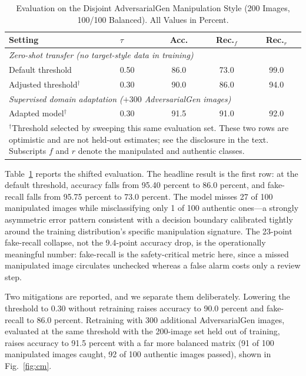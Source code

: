 \documentclass[conference,a4paper]{IEEEtran}
\begin{document}
\begin{table}[t]
\caption{Evaluation on the Disjoint AdversarialGen Manipulation Style
(200 Images, 100/100 Balanced). All Values in Percent.}
\label{tab:shift}
\centering
\setlength{\tabcolsep}{3pt}
\begin{tabular}{llccc}
\toprule
\textbf{Setting} & \textbf{$\tau$} & \textbf{Acc.} &
\textbf{Rec.$_{f}$} & \textbf{Rec.$_{r}$} \\
\midrule
\multicolumn{5}{l}{\emph{Zero-shot transfer (no target-style data in training)}} \\
Default threshold              & 0.50 & 86.0 & 73.0 & 99.0 \\
Adjusted threshold$^{\dagger}$ & 0.30 & 90.0 & 86.0 & 94.0 \\
\midrule
\multicolumn{5}{l}{\emph{Supervised domain adaptation ($+300$ AdversarialGen images)}} \\
Adapted model$^{\dagger}$      & 0.30 & 91.5 & 91.0 & 92.0 \\
\bottomrule
\multicolumn{5}{p{0.92\columnwidth}}{\footnotesize $^{\dagger}$Threshold
selected by sweeping this same evaluation set. These two rows are optimistic
and are not held-out estimates; see the disclosure in the text. Subscripts $f$
and $r$ denote the manipulated and authentic classes.}
\end{tabular}
\end{table}

Table~\ref{tab:shift} reports the shifted evaluation. The headline result is
the first row: at the default threshold, accuracy falls from 95.40 percent to
86.0 percent, and fake-recall falls from 95.75 percent to 73.0 percent. The
model misses 27 of 100 manipulated images while misclassifying only 1 of 100
authentic ones---a strongly asymmetric error pattern consistent with a
decision boundary calibrated tightly around the training distribution's
specific manipulation signature. The 23-point fake-recall collapse, not the
9.4-point accuracy drop, is the operationally meaningful number: fake-recall
is the safety-critical metric here, since a missed manipulated image
circulates unchecked whereas a false alarm costs only a review step.

Two mitigations are reported, and we separate them deliberately. Lowering the
threshold to 0.30 without retraining raises accuracy to 90.0 percent and
fake-recall to 86.0 percent. Retraining with 300 additional AdversarialGen
images, evaluated at the same threshold with the 200-image set held out of
training, raises accuracy to 91.5 percent with a far more balanced matrix
(91 of 100 manipulated images caught, 92 of 100 authentic images passed),
shown in Fig.~\ref{fig:cm}.
\end{document}
